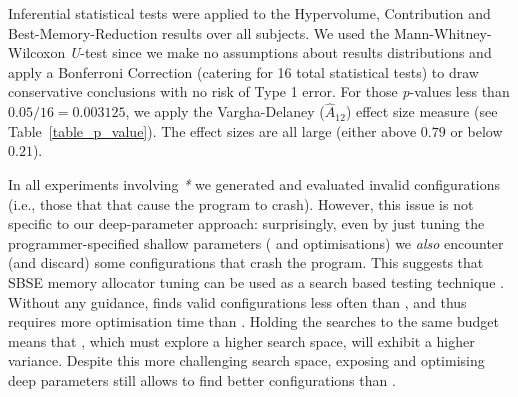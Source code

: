 
Inferential statistical tests were applied to the Hypervolume, Contribution and Best-Memory-Reduction results over all subjects.
We used the Mann-Whitney-Wilcoxon \emph{U}-test since we make no assumptions about results distributions and apply a Bonferroni Correction (catering for 16 total statistical tests) to draw conservative conclusions with no risk of Type 1 error.
For those \emph{p}-values less than $0.05/16=0.003125$, we apply the
Vargha-Delaney ($\hat{A}_{12}$) effect size measure (see Table~\ref{table_p_value}).
The effect sizes are all large (either above $0.79$ or below $0.21$).

In all experiments involving \emph{\all{}*} we generated and evaluated invalid
configurations (i.e., those that that cause the program to crash). However,
this issue is not specific to our deep-parameter approach: 
surprisingly, even by just tuning the programmer-specified shallow parameters 
(\sr{} and \sn{} optimisations) we {\em also} encounter (and discard) some
configurations that crash the program.
This suggests that SBSE memory allocator tuning can be used as a search based testing technique \cite{mh:icst14-keynote}.
Without any guidance, \dr{}
finds valid configurations less often than \sr{}, and thus requires more
optimisation time than \sr{}. Holding the searches to the same budget means
that \dn{}, which must explore a higher search space, will exhibit a higher
variance. 
Despite this more challenging search space, exposing and optimising deep
parameters still allows \dn{} to find better configurations
than \sn{}.

